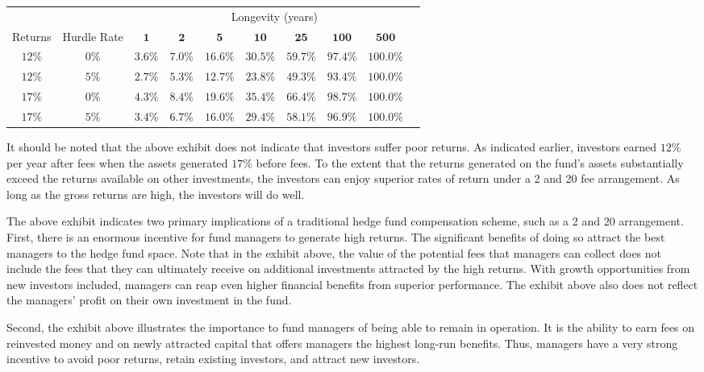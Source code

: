 \documentclass[11pt]{article}
\begin{document}
\begin{center}
\begin{tabular}{|cccccccccc|}
\hline
 &  & \multicolumn{8}{c}{Longevity (years)} \\
\cline { 9 - 10 }
Returns & Hurdle Rate & $\mathbf{1}$ & $\mathbf{2}$ & $\mathbf{5}$ & $\mathbf{1 0}$ & $\mathbf{2 5}$ & $\mathbf{1 0 0}$ & $\mathbf{5 0 0}$ &  \\
\hline
$12 \%$ & $0 \%$ & $3.6 \%$ & $7.0 \%$ & $16.6 \%$ & $30.5 \%$ & $59.7 \%$ & $97.4 \%$ & $100.0 \%$ &  \\
$12 \%$ & $5 \%$ & $2.7 \%$ & $5.3 \%$ & $12.7 \%$ & $23.8 \%$ & $49.3 \%$ & $93.4 \%$ & $100.0 \%$ &  \\
$17 \%$ & $0 \%$ & $4.3 \%$ & $8.4 \%$ & $19.6 \%$ & $35.4 \%$ & $66.4 \%$ & $98.7 \%$ & $100.0 \%$ &  \\
$17 \%$ & $5 \%$ & $3.4 \%$ & $6.7 \%$ & $16.0 \%$ & $29.4 \%$ & $58.1 \%$ & $96.9 \%$ & $100.0 \%$ &  \\
\hline
\end{tabular}
\end{center}

It should be noted that the above exhibit does not indicate that investors suffer poor returns. As indicated earlier, investors earned $12 \%$ per year after fees when the assets generated $17 \%$ before fees. To the extent that the returns generated on the fund's assets substantially exceed the returns available on other investments, the investors can enjoy superior rates of return under a 2 and 20 fee arrangement. As long as the gross returns are high, the investors will do well.

The above exhibit indicates two primary implications of a traditional hedge fund compensation scheme, such as a 2 and 20 arrangement. First, there is an enormous incentive for fund managers to generate high returns. The significant benefits of doing so attract the best managers to the hedge fund space. Note that in the exhibit above, the value of the potential fees that managers can collect does not include the fees that they can ultimately receive on additional investments attracted by the high returns. With growth opportunities from new investors included, managers can reap even higher financial benefits from superior performance. The exhibit above also does not reflect the managers' profit on their own investment in the fund.

Second, the exhibit above illustrates the importance to fund managers of being able to remain in operation. It is the ability to earn fees on reinvested money and on newly attracted capital that offers managers the highest long-run benefits. Thus, managers have a very strong incentive to avoid poor returns, retain existing investors, and attract new investors.
\end{document}
